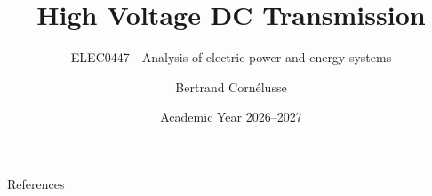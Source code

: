 \documentclass[aspectratio=169]{beamer}
\subtitle{ELEC0447 - Analysis of electric power and energy systems}
\title{High Voltage DC Transmission}
\author[BC]{Bertrand Cornélusse}
\institute{University of Liège}
\date{Academic Year 2026--2027}
\begin{document}


\begin{frame}[allowframebreaks]{References}
    
    
\end{frame}
\end{document}

